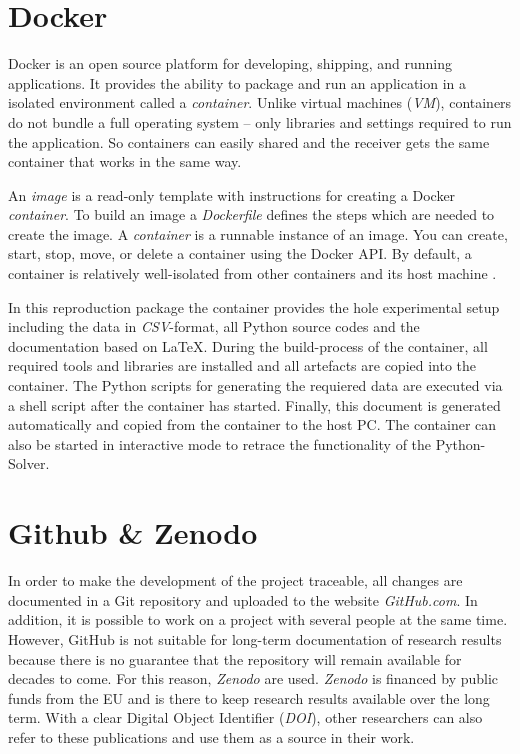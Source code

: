 \documentclass{article}
\begin{document}
\begin{multicols}{2}
\section{Docker} \label{sec:Docker}
Docker is an open source platform for developing, shipping, and running applications. It provides the ability to package and run an application in a isolated environment called a \textit{container}. Unlike virtual machines (\textit{VM}), containers do not bundle a full operating system -- only libraries and settings required to run the application. So containers can easily shared and the receiver gets the same container that works in the same way.

An \textit{image} is a read-only template with instructions for creating a Docker \textit{container}. To build an image a \textit{Dockerfile} defines the steps which are needed to create the image. A \textit{container} is a runnable instance of an image. You can create, start, stop, move, or delete a container using the Docker API. By default, a container is relatively well-isolated from other containers and its host machine \cite{Docker}. 

In this reproduction package the container provides the hole experimental setup including the data in \textit{CSV}-format, all Python source codes and the documentation based on \LaTeX. During the build-process of the container, all required tools and libraries are installed and all artefacts are copied into the container. The Python scripts for generating the requiered data are executed via a shell script after the container has started. Finally, this document is generated automatically and copied from the container to the host PC. The container can also be started in interactive mode to retrace the functionality of the Python-Solver.

\section{Github \& Zenodo}
In order to make the development of the project traceable, all changes are documented in a Git repository and uploaded to the website \textit{GitHub.com}. In addition, it is possible to work on a project with several people at the same time. However, GitHub is not suitable for long-term documentation of research results because there is no guarantee that the repository will remain available for decades to come. For this reason, \textit{Zenodo} are used.
\textit{Zenodo} \cite{zenodo} is financed by public funds from the EU and is there to keep research results available over the long term. With a clear Digital Object Identifier (\textit{DOI}), other researchers can also refer to these publications and use them as a source in their work.



\end{multicols}
\end{document}
